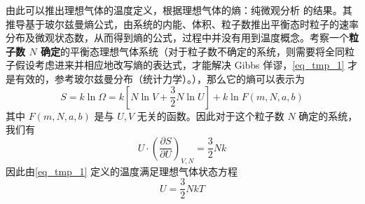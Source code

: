 由此可以推出理想气体的温度定义，根据理想气体的熵：纯微观分析 的结果。其推导基于玻尔兹曼熵公式，由系统的内能、体积、粒子数推出平衡态时粒子的速率分布及微观状态数，从而得到熵的公式，过程中并没有用到温度概念。考察一个\textbf{粒子数 $N$ 确定}的平衡态理想气体系统（对于粒子数不确定的系统，则需要将全同粒子假设考虑进来并相应地改写熵的表达式，才能解决 Gibbs 佯谬，\autoref{eq_tmp_1} 才是有效的，参考玻尔兹曼分布（统计力学）。），那么它的熵可以表示为
\begin{equation}
S=k\ln \Omega =k\left[ N\ln V+\frac{3}{2}N\ln U \right] +k\ln F\left( m,N,a,b \right) 
\end{equation}
其中 $F(m,N,a,b)$ 是与 $U,V$ 无关的函数。因此对于这个粒子数 $N$ 确定的系统，我们有
\begin{equation}
U\cdot \left(\frac{\partial S}{\partial U}\right)_{V,N}=\frac{3}{2}Nk
\end{equation}
因此由\autoref{eq_tmp_1} 定义的温度满足理想气体状态方程
\begin{equation}
U=\frac{3}{2}NkT
\end{equation}

